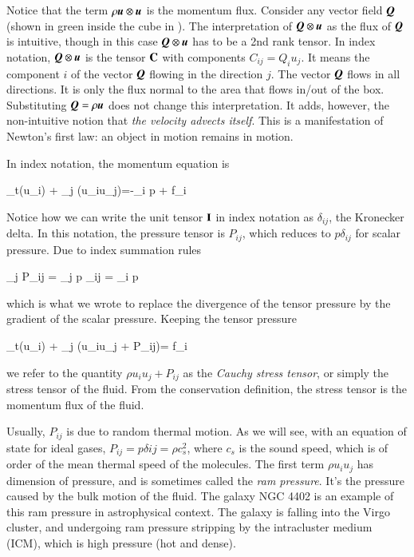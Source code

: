 Notice that the term $\rho{\boldsymbol{u}}\otimes{\boldsymbol{u}}$ is the momentum flux.
Consider any vector field ${\boldsymbol{Q}}$ (shown in green inside the cube in ).
The interpretation of ${\boldsymbol{Q}}\otimes{\boldsymbol{u}}$ as the flux of ${\boldsymbol{Q}}$ is intuitive, though in this
case ${\boldsymbol{Q}}\otimes{\boldsymbol{u}}$ has to be a 2nd rank tensor. In index notation, ${\boldsymbol{Q}}\otimes{\boldsymbol{u}}$ is the
tensor $\boldsymbol{\mathrm{C}}$ with components $C_{ij} = Q_i u_j$. It means the component $i$ of the
vector ${\boldsymbol{Q}}$ flowing in the direction $j$.
The vector ${\boldsymbol{Q}}$ flows in all directions. It is only the flux normal to the
area that flows in/out of the box.
Substituting ${\boldsymbol{Q}}=\rho{\boldsymbol{u}}$ does not change this interpretation. It adds,
however, the non-intuitive notion that {\it the velocity advects itself}. This
is a manifestation of Newton’s first law: an object in motion remains
in motion.

In index notation, the momentum equation is

\beq
\partial_t\left(\rho u_i\right) + \partial_j \left(\rho u_iu_j\right)=-\partial_i p + \rho f_i
\eeq

Notice how we can write the unit tensor $\boldsymbol{\mathrm{I}}$ in index notation as
$\delta_{ij}$, the Kronecker delta. In this notation, the pressure
tensor is $P_{ij}$, which reduces to $p\delta_{ij}$ for scalar
pressure. Due to index summation rules

\beq
\partial_j P_{ij} = \partial_j p \delta_{ij} = \partial_i p
\eeq

\noindent which is what we wrote to replace the divergence of the tensor
pressure by the gradient of the scalar pressure. Keeping the tensor
pressure

\beq
\partial_t\left(\rho u_i\right) + \partial_j \left(\rho u_iu_j + P_{ij}\right)= \rho f_i
\eeq

\noindent we refer to the quantity $\rho u_iu_j + P_{ij}$ as the {\it Cauchy
  stress tensor}, or simply the stress tensor of the fluid. From the
conservation definition, the stress tensor is the momentum flux of the
fluid. 

Usually, $P_{ij}$ is due to random thermal motion. As we will see, with
an equation of state for ideal gases, $P_{ij}=p\delta{ij}=\rho c_s^2$, where
$c_s$ is the sound speed, which is of order of the mean thermal speed
of the molecules. The first term $\rho u_iu_j$ has dimension of
pressure, and is sometimes called the {\it ram pressure}. It's the
pressure caused by the bulk motion of the fluid. The galaxy NGC 4402
 is an example of this ram pressure in
astrophysical context. The galaxy is falling into the Virgo
cluster, and undergoing ram pressure stripping by the intracluster
medium (ICM), which is high pressure (hot and dense).

